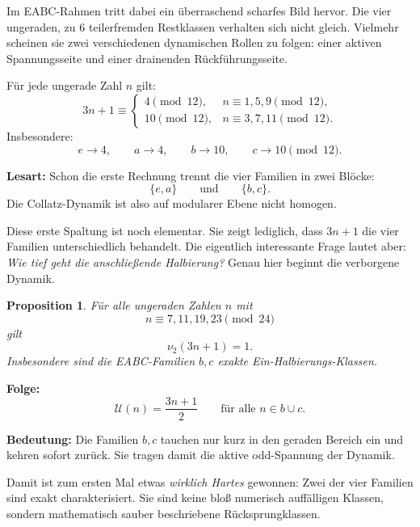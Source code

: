 \documentclass[12pt,a4paper]{article}
\newtheorem{proposition}{Proposition}
\newcommand{\vii}{\nu_2}
\newcommand{\U}{\mathcal U}
\begin{document}
Im EABC-Rahmen tritt dabei ein überraschend scharfes Bild hervor. Die vier ungeraden, zu \(6\) teilerfremden Restklassen verhalten sich nicht gleich. Vielmehr scheinen sie zwei verschiedenen dynamischen Rollen zu folgen: einer aktiven Spannungsseite und einer drainenden Rückführungsseite.

\vspace{0.6em}

\begin{tcolorbox}[
colback=blue!3,
colframe=blue!50!black,
title=\textbf{1. Erste Beobachtung: Schon modulo 12 spaltet sich die Dynamik}
]
Für jede ungerade Zahl \(n\) gilt:
\[
3n+1\equiv
\begin{cases}
4 \pmod{12},& n\equiv 1,5,9 \pmod{12},\\
10 \pmod{12},& n\equiv 3,7,11 \pmod{12}.
\end{cases}
\]
Insbesondere:
\[
e\to 4,\qquad a\to 4,\qquad b\to 10,\qquad c\to 10 \pmod{12}.
\]

\medskip
\textbf{Lesart:}
Schon die erste Rechnung trennt die vier Familien in zwei Blöcke:
\[
\{e,a\}\qquad\text{und}\qquad\{b,c\}.
\]
Die Collatz-Dynamik ist also auf modularer Ebene nicht homogen.
\end{tcolorbox}

\noindent
Diese erste Spaltung ist noch elementar. Sie zeigt lediglich, dass \(3n+1\) die vier Familien unterschiedlich behandelt. Die eigentlich interessante Frage lautet aber: \emph{Wie tief geht die anschließende Halbierung?} Genau hier beginnt die verborgene Dynamik.

\begin{tcolorbox}[
colback=green!3,
colframe=green!40!black,
title=\textbf{2. Exakter Satz: Zwei Familien sind Ein-Halbierungs-Klassen}
]
\begin{proposition}
Für alle ungeraden Zahlen \(n\) mit
\[
n\equiv 7,11,19,23 \pmod{24}
\]
gilt
\[
\vii(3n+1)=1.
\]
Insbesondere sind die EABC-Familien \(b,c\) exakte Ein-Halbierungs-Klassen.
\end{proposition}

\textbf{Folge:}
\[
\U(n)=\frac{3n+1}{2}
\qquad\text{für alle } n\in b\cup c.
\]

\medskip
\textbf{Bedeutung:}
Die Familien \(b,c\) tauchen nur kurz in den geraden Bereich ein und kehren sofort zurück. Sie tragen damit die aktive odd-Spannung der Dynamik.
\end{tcolorbox}

\noindent
Damit ist zum ersten Mal etwas \emph{wirklich Hartes} gewonnen: Zwei der vier Familien sind exakt charakterisiert. Sie sind keine bloß numerisch auffälligen Klassen, sondern mathematisch sauber beschriebene Rücksprungklassen.
\end{document}
